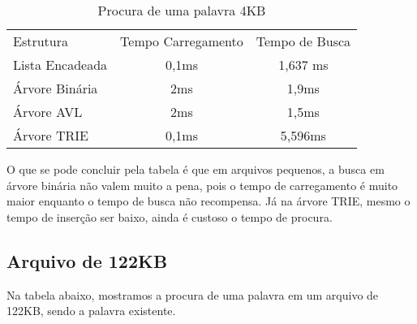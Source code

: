 \documentclass[
	12pt,				%
    oneside,			%
	a4paper,			%
	english,			%
	french,				%
	spanish,			%
	brazil,				%
	]{abntex2}
\begin{document}
\begin{table}[!h]
    \centering
    \begin{minipage}{0.7\hsize}
    \caption{Procura de uma palavra 4KB}
\begin{tabular}{lcc}
\rowcolor[HTML]{FFCCC9}
Estrutura      & \multicolumn{1}{l}{\cellcolor[HTML]{FFCCC9}Tempo Carregamento} & \multicolumn{1}{l}{\cellcolor[HTML]{FFCCC9}Tempo de Busca} \\
\rowcolor[HTML]{C0C0C0}
Lista Encadeada & 0,1ms                                                          & 1,637 ms                                                   \\
\rowcolor[HTML]{FFCCC9}
Árvore Binária  & 2ms                                                            & 1,9ms                                                      \\
\rowcolor[HTML]{C0C0C0}
Árvore AVL      & 2ms                                                            & 1,5ms                                                      \\
\rowcolor[HTML]{FFCCC9}
Árvore TRIE     & 0,1ms                                                          & 5,596ms
\end{tabular}
\end{minipage}
\end{table}

O que se pode concluir pela tabela é que em arquivos pequenos, a busca em árvore binária não valem muito a pena, pois o tempo de carregamento é muito maior enquanto o tempo de busca não recompensa. Já na árvore TRIE, mesmo o tempo de inserção ser baixo, ainda é custoso o tempo de procura.

\subsection{Arquivo de 122KB}
Na tabela abaixo, mostramos a procura de uma palavra em um arquivo de 122KB, sendo a palavra existente.
\end{document}
